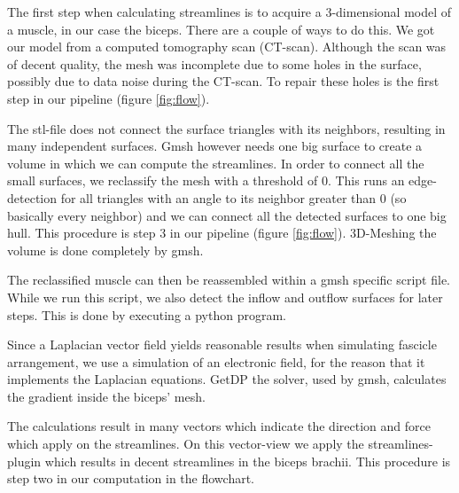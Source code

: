 \documentclass[preprint,journal]{vgtc}       %
\begin{document}
The first step when calculating streamlines is to acquire a 3-dimensional model of a muscle, in our case the biceps.
There are a couple of ways to do this.
We got our model from a computed tomography scan (CT-scan).
Although the scan was of decent quality, the mesh was incomplete due to some holes in the surface, possibly due to data noise during the CT-scan.
To repair these holes is the first step in our pipeline (figure \ref{fig:flow}). 

The stl-file does not connect the surface triangles with its neighbors, resulting in many independent surfaces. 
Gmsh however needs one big surface to create a volume in which we can compute the streamlines. 
In order to connect all the small surfaces, we reclassify the mesh with a threshold of 0.
This runs an edge-detection for all triangles with an angle to its neighbor greater than 0 (so basically every neighbor) and we can connect all the detected surfaces to one big hull.
This procedure is step 3 in our pipeline (figure \ref{fig:flow}). 
3D-Meshing the volume is done completely by gmsh. 

The reclassified muscle can then be reassembled within a gmsh specific script file.
While we run this script, we also detect the inflow and outflow surfaces for later steps.
This is done by executing a python program. 
 
Since a Laplacian vector field yields reasonable results when simulating fascicle arrangement, we use a simulation of an electronic field, for the reason that it implements the Laplacian equations. 
GetDP the solver, used by gmsh, calculates the gradient inside the biceps' mesh.

The calculations result in many vectors which indicate the direction and force which apply on the  streamlines. 
On this vector-view we apply the streamlines-plugin which results in decent streamlines in the biceps brachii.
This procedure is step two in our computation in the flowchart.
\end{document}
